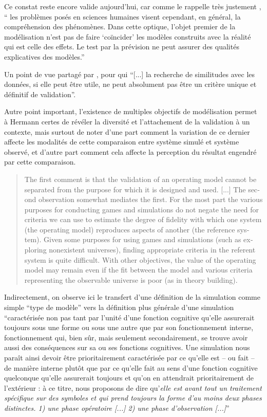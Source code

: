 Ce constat reste encore valide aujourd'hui, car comme le rappelle très justement \textcite[32]{Bulle2005}, \enquote{ les problèmes posés en sciences humaines visent cependant, en général, la compréhension des phénomènes. Dans cette optique, l’objet premier de la modélisation n’est pas de faire \enquote{coïncider} les modèles construits avec la réalité qui est celle des effets. Le test par la prévision ne peut assurer des qualités explicatives des modèles.}

Un point de vue partagé par \textcite[106]{Amblard2006}, pour qui \enquote{[...] la recherche de similitudes avec les données, si elle peut être utile, ne peut absolument pas être un critère unique et définitif de validation}.

Autre point important, l'existence de multiples objectifs de modélisation permet à Hermann certes de révéler la diversité et l'attachement de la validation à un contexte, mais surtout de noter d'une part comment la variation de ce dernier affecte les modalités de cette comparaison entre système simulé et système observé, et d'autre part comment cela affecte la perception du résultat engendré par cette comparaison.

\foreignblockquote{english}[{\cite[219]{Hermann1967}}]{The first comment is that the validation of an operating model cannot be separated from the purpose for which it is designed and used. [...] The second observation somewhat mediates the first. For the most part the various purposes for conducting games and simulations do not negate the need for criteria we can use to estimate the degree of fidelity with which one system (the operating model) reproduces aspects of another (the reference system). Given some purposes for using games and simulations (such as exploring nonexistent universes), finding appropriate criteria in the referent system is quite difficult. With other objectives, the value of the operating model may remain even if the fit between the model and various criteria representing the observable universe is poor (as in theory building).}

Indirectement, on observe ici le transfert d'une définition de la simulation comme simple \enquote{type de modèle} vers la définition plus générale d'une simulation \enquote{caractérisée non pas tant par l’unité d’une fonction cognitive qu’elle assurerait toujours sous une forme ou sous une autre que par son fonctionnement interne, fonctionnement qui, bien sûr, mais seulement secondairement, se trouve avoir aussi des conséquences sur sa ou ses fonctions cognitives. Une simulation nous paraît ainsi devoir être prioritairement caractérisée par ce qu’elle est – ou fait – de manière interne plutôt que par ce qu’elle fait au sens d’une fonction cognitive quelconque qu’elle assurerait toujours et qu’on en attendrait prioritairement de l’extérieur : à ce titre, nous proposons de dire qu’\textit{elle est avant tout un traitement spécifique sur des symboles et qui prend toujours la forme d'au moins deux phases distinctes. 1) une phase opératoire [...] 2) une phase d'observation [...]}} \autocite[33-34]{Varenne2013b}

